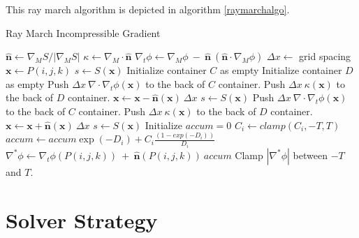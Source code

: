 \documentclass{article}
\def\xvec{\textbf{x}}
\def\nhat{\hat{\textbf{n}}}
\def\dx{\Delta x}
\def\inabla{\nabla^{*}}
\def\dx{\Delta x}
\begin{document}
This ray march algorithm is depicted in algorithm \ref{raymarchalgo}.
\begin{algorithm}
\caption{Ray March Incompressible Gradient}\label{raymarchalgo}
\begin{algorithmic}
\State $\nhat \gets \nabla_M S / |\nabla_M S|$ 
\State $\kappa \gets \nabla_M\cdot\nhat$
\State $\nabla_t\phi \gets \nabla_M\phi \ -\ \nhat\ (\nhat\cdot\nabla_M\phi)$
\State $\dx \gets $ grid spacing 
\State $\xvec \gets P(i,j,k)$ 
\State $s \gets S(\xvec)$
\State Initialize container $C$ as empty
\State Initialize container $D$ as empty
 
\State Push $\dx\ \nabla\cdot\nabla_t\phi(\xvec)$ to the back of $C$ container.
\State Push $\dx\ \kappa(\xvec)$ to the back of $D$ container.
\State $\xvec \gets \xvec - \nhat(\xvec)\ \dx$
\State $s \gets S(\xvec)$
\EndWhile
\Else {}
\State Push $\dx\ \nabla\cdot\nabla_t\phi(\xvec)$ to the back of $C$ container.
\State Push $\dx\ \kappa(\xvec)$ to the back of $D$ container.
\State $\xvec \gets \xvec + \nhat(\xvec)\ \dx$
\State $s \gets S(\xvec)$
\EndWhile
\EndIf
\State Initialize $accum = 0$
\State $C_i \gets clamp( C_i, -T, T )$ 
\State $accum \gets accum \exp(-D_i) + C_i \frac{(1-exp(-D_i))}{D_i}$
\EndFor
\State $\inabla\phi \gets \nabla_t\phi(P(i,j,k))\ +\ \nhat(P(i,j,k))\ accum$
\State Clamp $|\inabla\phi|$ between $-T$ and $T$.
\EndFor
\EndProcedure
\end{algorithmic}
\end{algorithm}



\section{Solver Strategy}
\end{document}
